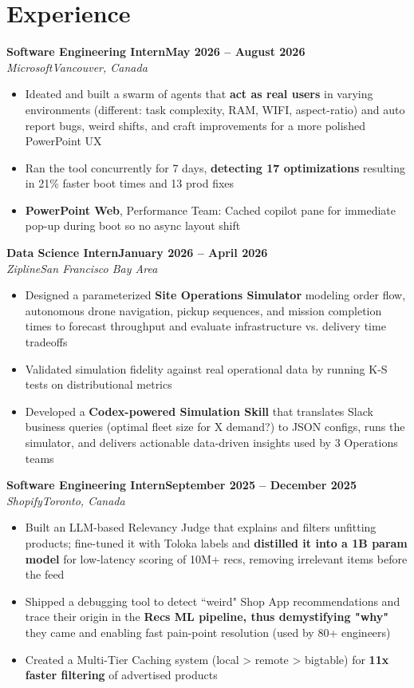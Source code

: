 \documentclass[letterpaper,10pt]{article}
\newcommand{\entry}[4]{\textbf{#1}\hfill\textbf{\small #2}\\\textit{\small #3}\hfill\textit{\small #4}\par}
\begin{document}
\section{Experience}
\entry{Software Engineering Intern}{May 2026 -- August 2026}{Microsoft}{Vancouver, Canada}
\begin{itemize}\small
\item Ideated and built a swarm of agents that \textbf{act as real users} in varying environments (different: task complexity, RAM, WIFI, aspect-ratio) and auto report bugs, weird shifts, and craft improvements for a more polished PowerPoint UX
\item Ran the tool concurrently for 7 days, \textbf{detecting 17 optimizations} resulting in 21\% faster boot times and 13 prod fixes
\item \textbf{PowerPoint Web}, Performance Team: Cached copilot pane for immediate pop-up during boot so no async layout shift
\end{itemize}\vspace{2pt}
\entry{Data Science Intern}{January 2026 -- April 2026}{Zipline}{San Francisco Bay Area}
\begin{itemize}\small
\item Designed a parameterized \textbf{Site Operations Simulator} modeling order flow, autonomous drone navigation, pickup sequences, and mission completion times to forecast throughput and evaluate infrastructure vs. delivery time tradeoffs
\item Validated simulation fidelity against real operational data by running K-S tests on distributional metrics
\item Developed a \textbf{Codex-powered Simulation Skill} that translates Slack business queries (optimal fleet size for X demand?) to JSON configs, runs the simulator, and delivers actionable data-driven insights used by 3 Operations teams
\end{itemize}\vspace{2pt}
\entry{Software Engineering Intern}{September 2025 -- December 2025}{Shopify}{Toronto, Canada}
\begin{itemize}\small
\item Built an LLM-based Relevancy Judge that explains and filters unfitting products; fine-tuned it with Toloka labels and \textbf{distilled it into a 1B param model} for low-latency scoring of 10M+ recs, removing irrelevant items before the feed
\item Shipped a debugging tool to detect ``weird" Shop App recommendations and trace their origin in the \textbf{Recs ML pipeline, thus demystifying "why"} they came and enabling fast pain-point resolution (used by 80+ engineers)
\item Created a Multi-Tier Caching system (local \textgreater{} remote \textgreater{} bigtable) for \textbf{11x faster filtering} of advertised products
\end{itemize}\vspace{2pt}
\end{document}
